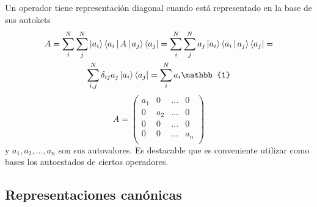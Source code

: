\documentclass[10pt,oneside]{CBFT_book}
\begin{document}
Un operador tiene representación diagonal cuando está representado en la base de sus
autokets
\begin{multline*}
 	A = \sum_i^N\sum_j^N \Ket{a_i}\Braket{a_i|A|a_j}\Bra{a_j} =
		\sum_i^N\sum_j^N a_j\Ket{a_i}\Braket{a_i|a_j}\Bra{a_j} = \\
		\sum_{i,j}^N \delta_{ij} a_j \Ket{a_i}\Bra{a_j} = \sum_i^N a_i \mathbb{1}
\end{multline*}
\[
	A = \begin{pmatrix} 
		a_1 & 0 & ... & 0 \\
		0 & a_2 & ... & 0 \\
		0 & 0 & ... & 0 \\
		0 & 0 & ... & a_n \\
	\end{pmatrix}
\]
y $a_1,a_2,...,a_n$ son sus autovalores.
Es destacable que es conveniente utilizar como bases los autoestados de ciertos operadores.

\subsection{Representaciones canónicas}
\end{document}
